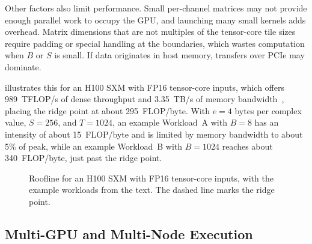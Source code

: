 Other factors also limit performance. Small per-channel matrices may not provide enough parallel work to occupy the GPU, and launching many small kernels adds overhead. Matrix dimensions that are not multiples of the tensor-core tile sizes require padding or special handling at the boundaries, which wastes computation when $B$ or $S$ is small. If data originates in host memory, transfers over PCIe may dominate.

 illustrates this for an H100 SXM with FP16 tensor-core inputs, which offers 989~TFLOP/s of dense throughput and 3.35~TB/s of memory bandwidth~\cite{h100Datasheet}, placing the ridge point at about 295~FLOP/byte. With $e = 4$ bytes per complex value, $S = 256$, and $T = 1024$, an example Workload~A with $B = 8$ has an intensity of about 15~FLOP/byte and is limited by memory bandwidth to about 5\% of peak, while an example Workload~B with $B = 1024$ reaches about 340~FLOP/byte, just past the ridge point.

\begin{figure}[H]
  \centering
  \caption{Roofline for an H100 SXM with FP16 tensor-core inputs, with the example workloads from the text. The dashed line marks the ridge point.}
  \label{fig:roofline}
\end{figure}

\subsection{Multi-GPU and Multi-Node Execution}
\label{sec:multi-gpu-and-multi-node-execution}


